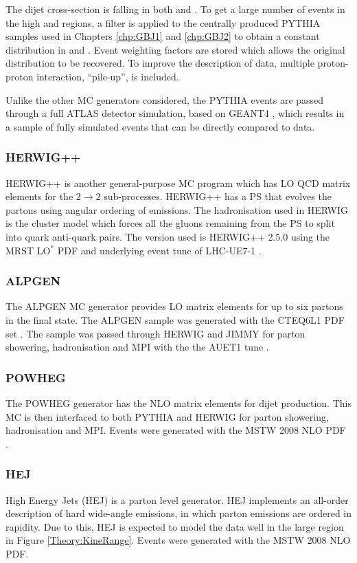 The dijet cross-section is falling in both \ptb{} and \dy{}.
To get a large number of events in the high \ptb{} and \dy{} regions, a filter is applied to the centrally produced PYTHIA samples used in Chapters \ref{chp:GBJ1} and \ref{chp:GBJ2} to obtain a constant distribution in \ptb{} and \dy{}. 
Event weighting factors are stored which allows the original distribution to be recovered. 
To improve the description of data, multiple proton-proton interaction, ``pile-up'', is included.

Unlike the other MC generators considered, the PYTHIA events are passed through a full ATLAS detector simulation, based on GEANT4 \cite{ref:Geant4}, which results in a sample of fully simulated events that can be directly compared to data. 

\subsubsection{HERWIG++}

HERWIG++\cite{ref:HERWIG} is another general-purpose MC program which has LO QCD matrix elements for the $2 \rightarrow 2$ sub-processes.
HERWIG++ has a PS that evolves the partons using angular ordering of emissions.
The hadronisation used in HERWIG is the cluster model \cite{ref:ClusterModel} which forces all the gluons remaining from the PS to split into quark anti-quark pairs. 
The version used is HERWIG++ 2.5.0 \cite{ref:HERWIG} using the MRST LO$^*$ PDF and underlying event tune of LHC-UE7-1 \cite{ref:Herwigpp}. 
\subsubsection{ALPGEN}

The ALPGEN \cite{ref:ALPGEN} MC generator provides LO matrix elements for up to six partons in the final state.
The ALPGEN sample was generated with the CTEQ6L1 PDF set \cite{ref:ALPGENPDF}.
The sample was passed through HERWIG and JIMMY \cite{ref:Jimmy} for parton showering, hadronisation and MPI with the the AUET1 tune \cite{ref:ALPGENTune}.

\subsubsection{POWHEG}
The POWHEG generator \cite{ref:Powheg1,ref:Powheg2,ref:Powheg3} has the NLO matrix elements for dijet production. 
This MC is then interfaced to both PYTHIA and HERWIG for parton showering, hadronisation and MPI.
Events were generated with the MSTW 2008 NLO PDF \cite{ref:MRST}.


\subsubsection{HEJ}
High Energy Jets (HEJ) \cite{ref:HEJ1,ref:HEJ2} is a parton level generator. 
HEJ implements an all-order description of hard wide-angle emissions, in which parton emissions are ordered in rapidity.
Due to this, HEJ is expected to model the data well in the large \dy{} region in Figure \ref{Theory:KineRange}.
Events were generated with the MSTW 2008 NLO PDF.

